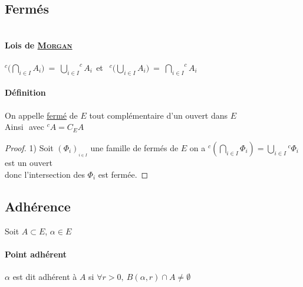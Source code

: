 	\subsection{Fermés}
	${}$ \vspace*{-1cm}\\ 
		\paragraph{Lois de \underline{\textsc{Morgan}}}
			$^c\Big(\bigcap\limits_{i\in I} A_i \Big) ~=~ {\bigcup\limits_{i\in I}} ^cA_i ~~$et
			$~~ ^c\Big(\bigcup\limits_{i\in I} A_i \Big) ~=~ {\bigcap\limits_{i\in I}} ^cA_i$ \vspace*{0.2cm}\traitd
		\paragraph{Définition}
			On appelle \underline{fermé} de $E$ tout complémentaire d'un ouvert dans $E$ \\
			Ainsi  ${}$ avec $^cA = C_E A$ \trait
		\begin{proof}
		{\small 1)} Soit $\left( \Phi_i \right)_{_{i\in I}}$ une famille de fermés de $E$ on a ${^c\left(\bigcap\limits_{i\in I} \Phi_i \right)} = 
		\bigcup\limits_{i\in I} {^c\Phi_i}$ est un ouvert \\ donc l'intersection des $\Phi_i$ est fermée.
		\end{proof}
	\subsection{Adhérence}
		\hspace*{0.3cm} Soit $A\subset E$, $\alpha\in E$ \traitd
		\paragraph{Point adhérent} $\alpha$ est dit adhérent à $A$ si $\forall r>0 ,~B(\alpha ,r) \cap A \neq \emptyset$ \trait ${}$ 							\vspace*{-1.5cm} \\  \traitd
